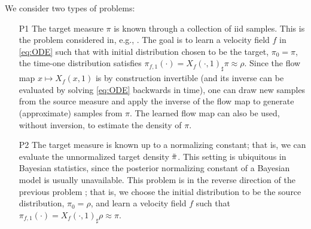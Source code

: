 
We consider two types of problems:
\begin{itemize}
\item[P1] The target measure $\pi$ is known through a collection of
  iid samples. This is the problem considered in, e.g., \citet{ffjord,HowToTrain,OTFlow}. The goal is
  to %
  learn %
  a velocity field $f$ in \eqref{eq:ODE}
  such that with initial distribution chosen to be the target, $\pi_{0} = \pi$, the time-one distribution satisfies $\pi_{f,1}(\cdot) = X_f(\cdot,1)_\sharp \pi \approx \rho$. Since the flow map $x \mapsto X_f(x,1)$ is by construction invertible (and its inverse can be evaluated by solving \eqref{eq:ODE} backwards in time), one can draw new samples from the source measure and apply the inverse of the flow map to generate (approximate) samples from $\pi$. The learned flow map can also be used, without inversion, to estimate the density of $\pi$.
  
  
  
\item[P2] The target measure is known up to a normalizing constant;
  that is, we can evaluate the unnormalized target density $\Tilde{\pi}$. This setting is ubiquitous in Bayesian statistics, since the posterior normalizing constant of a Bayesian model is usually unavailable. This problem is in the reverse direction of the previous problem \citep{measure-transport,PlanarFlow,moselhy2012}; that is, we choose the initial distribution to be the source distribution, $\pi_0 = \rho$, and learn a velocity field $f$ such that $\pi_{f,1}(\cdot) = X_f(\cdot,1)_\sharp \rho \approx \pi$. 
    
\end{itemize}




